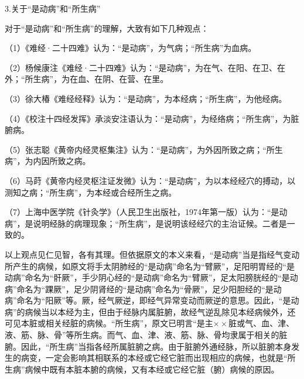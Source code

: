 \documentclass[12pt]{ctexbook}%
\begin{document}
3.关于“是动病”和“所生病”

对于“是动病”和“所生病”的理解，大致有如下几种观点：

（1）《难经·二十四难》认为：“是动病”，为气病；“所生病”为血病。

（2）杨候康注《难经·二十四难》认为：“是动病”，为在气、在阳、在卫、在外；“所生病”，为在血、在阴、在营、在里。

（3）徐大椿《难经经释》认为：“是动病”，为本经病；“所生病”，为他经病。

（4）《校注十四经发挥》承淡安注语认为：“是动病”，为经络病；“所生病”，为脏腑病。

（5）张志聪《黄帝内经灵枢集注》认为：“是动病”，为外因所致之病；“所生病”，为内因所致之病。

（6）马莳《黄帝内经灵枢注证发微》认为：“是动病”，为以本经经穴的搏动，以测知之病；“所生病”，为本经或合经所生之病。

（7）上海中医学院《针灸学》（人民卫生出版社，1974年第一版）认为：“是动病”，是说明经脉的病理现象；“所生病”，是说明该经经穴的主治证候。二者是一致的。

以上观点见仁见智，各有其理。但依据原文的本义来看，“是动病”当是指经气变动所产生的病候，如原文将手太阴肺经的“是动病”命名为“臂厥”，足阳明胃经的“是动病”命名为“骭厥”，手少阴心经的“是动病”命名为“臂厥”，足太阳膀胱经的“是动病”命名为“踝厥”，足少阴肾经的“是动病”命名为“骨厥”，足少阳胆经的“是动病”命名为“阳厥”等。厥，经气厥逆，即经气异常变动而厥逆的意思。因此，“是动病”的病候当以本经为主，但由于经脉内属脏腑，故经气逆乱除见本经病候外，还可见本脏或相关经脏的病候。“所生病”，原文已明言“是主$\times\times$脏或气、血、津、液、筋、脉、骨”等所生病。而气、血、津、液、筋、脉、骨均隶属于相关的脏腑。因此，“所生病”当指各经所属脏腑之病。由于脏腑外通经脉，所以脏腑本身发生的病变，一定会影响其相联系的本经或它经它脏而出现相应的病候，也就是“所生病”病候中既有本脏本腑的病候，又有本经或它经它脏（腑）病候的原因。

\end{document}

